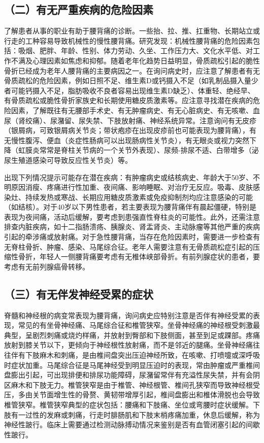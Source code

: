 \subsection{（二）有无严重疾病的危险因素}

了解患者从事的职业有助于腰背痛的诊断。一些抬、拉、推、扛重物、长期站立或行走的工种容易导致机械性的慢性腰背痛。研究发现：机械性腰背痛的危险因素包括：吸烟、肥胖、年龄、性别、体力劳动、久坐、工作压力大、文化水平低、对工作不满及心理因素如焦虑和抑郁。随着老年化趋势日益明显，骨质疏松引起的脆性骨折已经成为老年人腰背痛的主要病因之一。在询问病史时，应注意了解患者有无骨质疏松的危险因素，例如日照不足、维生素D或钙摄入不足（如乳制品摄入量少者可能钙摄入不足，脂肪吸收不良者容易出现维生素D缺乏）、体重轻、绝经早、有骨质疏松或脆性骨折家族史和长期使用糖皮质激素等。应注意寻找潜在疾病的危险因素，了解既往有无腰部手术史、有无肿瘤病史、有无心脏病史、有无咳嗽、血尿（肾绞痛）、尿潴留、尿失禁、下肢放射痛、神经系统异常。注意询问有无皮疹（银屑病，可致银屑病关节炎；带状疱疹在出现皮疹前也可能表现为腰背痛），有无慢性腹泻、便血（炎症性肠病可以出现肠病性关节炎），有无眼炎或视力突然下降（虹膜炎常常是脊柱关节病的一个关节外表现）、尿频-排尿不适、白带增多（泌尿生殖道感染可导致反应性关节炎）等。

出现下列情况提示可能存在潜在疾病：有肿瘤病史或结核病史、年龄大于50岁、不明原因消瘦、疼痛进行性加重、夜间痛、影响睡眠、对治疗无反应。吸毒、皮肤感染灶、持续发热或寒战、长期应用糖皮质激素或免疫抑制剂均应注意感染的可能（如结核）。对于40岁以下男性患者，若主要表现为腰背痛伴有晨起僵硬，特别是表现为夜间痛，活动后缓解，要考虑到患强直性脊柱炎的可能性。此外，还需注意排查内脏疾病，如十二指肠溃疡、胰腺炎、肾盂肾炎、主动脉瘤等其他严重的疾病引起的牵涉痛或放射痛。对于急性腰背痛，当存在危险因素时，需要进一步检查有无脊柱骨折、肿瘤、感染、马尾综合征。老年人需要注意有无骨质疏松症引起的压缩性骨折，年轻人一侧腰背痛要考虑有无椎体峡部骨折。有前列腺症状的患者，要考虑有无前列腺癌骨转移。

\subsection{（三）有无伴发神经受累的症状}

脊髓和神经根的病变常表现为腰背痛，询问病史应特别注意是否伴有神经受累的表现，常见的有坐骨神经痛、马尾综合征和椎管狭窄。坐骨神经痛的神经根受刺激最典型，呈剧烈刺痛或烧灼样痛，并放射到臀部和下肢侧面，甚至到足或踝部。疼痛放射到膝关节以下，更倾向于神经根性放射痛，而不是邻近的腿痛。坐骨神经痛往往伴有下肢麻木和刺痛，是由椎间盘突出压迫神经所致，在咳嗽、打喷嚏或深呼吸时症状加重。马尾综合征是马尾神经受到明显压迫时的表现，常由肿瘤或严重椎间盘膨出引起，可出现排便和排尿功能障碍，尿潴留常伴有充溢性尿失禁，并有会阴区麻木和下肢无力。椎管狭窄是由于椎管、神经根管、椎间孔狭窄而导致神经根受压，多由关节面增生性的骨赘、黄韧带增厚引起，椎间盘膨出和椎体滑脱也会导致椎管狭窄。椎管狭窄典型的症状包括：腰痛和下肢痛、坐位或弯腰时症状缓解。下肢有一过性的发麻或刺痛，行走时腓肠肌和下肢末梢疼痛加重，休息后缓解，称为神经性跛行。临床上需要通过检测动脉搏动情况来鉴别是否有血管闭塞引起的间歇性跛行。

